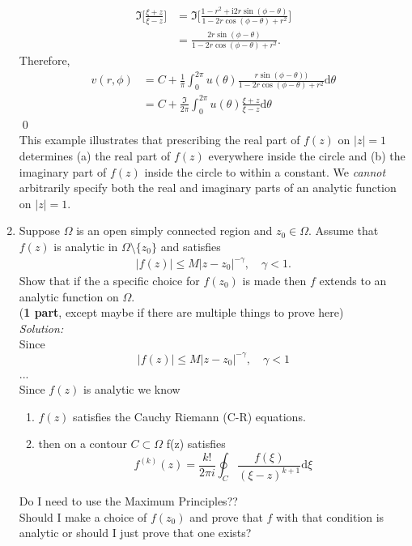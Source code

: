 \documentclass[10pt]{amsart}
\newcommand{\D}{\mathrm{d}}
\newcommand{\I}{\mathrm{i}}
\theoremstyle{nonumberplain}
\begin{document}
\begin{enumerate}[label={\bf {\arabic*}:}]
\begin{align*}
\Im \bigg[\frac {\xi + z}{\xi - z} \bigg] &= \Im \bigg[\frac {1 - r^2 + \I 2 r\sin(\phi - \theta)}{1 - 2r \cos (\phi - \theta) + r^2} \bigg] \\
	&= \frac {2 r\sin(\phi - \theta)}{1 - 2r \cos (\phi - \theta) + r^2}.
\end{align*}
Therefore, 
\begin{align*}
v(r, \phi) &= C + \frac 1 {\pi} \int_0^{2\pi} u(\theta) \frac{r\sin(\phi -\theta))}{1 - 2r \cos (\phi-\theta) + r^2} \D \theta \\
	&= C + \frac \Im {2\pi} \int_0^{2\pi} u(\theta) \frac {\xi + z}{\xi - z} \D \theta
\end{align*}
\qed \\
This example illustrates that prescribing the real part of $f(z)$ on $|z| = 1$ determines (a) the real part of $f(z)$ everywhere inside the circle and (b) the imaginary part of $f(z)$ inside the circle to within a constant.
We \textit{cannot} arbitrarily specify both the real and imaginary parts of an analytic function on $|z| = 1$.

\item Suppose $\Omega$ is an open simply connected region and $z_0 \in
  \Omega$.  Assume that $f(z)$ is analytic in $\Omega\setminus
  \{z_0\}$ and satisfies
  \begin{align*}
    |f(z)| \leq M |z - z_0|^{-\gamma}, \quad \gamma < 1.
  \end{align*}
  Show that if the a specific choice for $f(z_0)$ is made then $f$
  extends to an analytic function on $\Omega$. \\
(\textbf{1 part}, except maybe if there are multiple things to prove here) \\
\textit{Solution:} \\
Since 
$$|f(z)| \leq M |z - z_0|^{-\gamma}, \quad \gamma < 1$$
...\\
Since $f(z)$ is analytic we know
\begin{enumerate}
\item $f(z)$ satisfies the Cauchy Riemann (C-R) equations.
\item then on a contour $C \subset \Omega$ f(z) satisfies
$$
f^{(k)}(z) = \frac {k!}{2 \pi i} \oint_C \frac {f(\xi)}{(\xi - z)^{k + 1}}\D \xi
$$
\end{enumerate}
Do I need to use the Maximum Principles?? \\
Should I make a choice of $f(z_0)$ and prove that $f$ with that condition is analytic or should I just prove that one exists?


\end{enumerate}
\end{document}
